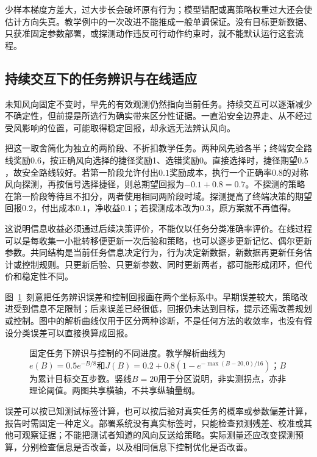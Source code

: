 少样本梯度方差大，过大步长会破坏原有行为；模型错配或离策略权重过大还会使估计方向失真。教学例中的一次改进不能推成一般单调保证。没有目标更新数据、只获准固定参数部署，或探测动作违反可行动作约束时，就不能默认运行这套流程。

\subsection{持续交互下的任务辨识与在线适应}
\label{sec:rl-transfer-identification}

未知风向固定不变时，早先的有效观测仍然指向当前任务。持续交互可以逐渐减少不确定性，但前提是所选行为确实带来区分性证据。一直沿安全边界走、从不经过受风影响的位置，可能取得稳定回报，却永远无法辨认风向。

把这一取舍简化为独立的两阶段、不折扣教学任务。两种风先验各半；终端安全路线奖励$0.6$，按正确风向选择的捷径奖励1、选错奖励0。直接选择时，捷径期望$0.5$，故安全路线较好。若第一阶段允许付出$0.1$奖励成本，执行一个正确率$0.8$的对称风向探测，再按信号选择捷径，则总期望回报为$-0.1+0.8=0.7$。不探测的策略在第一阶段等待且不扣分，两者使用相同两阶段时域。探测提高了终端决策的期望回报$0.2$，付出成本$0.1$，净收益$0.1$；若探测成本改为$0.3$，原方案就不再值得。

这说明信息收益必须通过后续决策评价，不能仅以任务分类准确率评价。在线过程可以是每收集一小批转移便更新一次后验和策略，也可以逐步更新记忆、偶尔更新参数。共同结构是当前任务信息决定行为，行为决定新数据，新数据再更新任务估计或控制规则。只更新后验、只更新参数、同时更新两者，都可能形成闭环，但代价和稳定性不同。

图~\ref{fig:rl-transfer-identification-curves}~刻意把任务辨识误差和控制回报画在两个坐标系中。早期误差较大，策略改进受到信息不足限制；后来误差已经很低，回报仍未达到目标，提示还需改善规划或控制。图中的解析曲线仅用于区分两种诊断，不是任何方法的收敛率，也没有假设分类误差可以直接换算成回报。

\begin{figure}[htbp]
 \centering
 
 \caption{固定任务下辨识与控制的不同进度。教学解析曲线为$e(B)=0.5e^{-B/8}$和$J(B)=0.2+0.8(1-e^{-\max(B-20,0)/16})$；$B$为累计目标交互步数。竖线$B=20$用于分区说明，非实测拐点，亦非理论阈值。两图共享横轴，不共享纵轴量纲。}
 \label{fig:rl-transfer-identification-curves}
\end{figure}

误差可以按已知测试标签计算，也可以按后验对真实任务的概率或参数偏差计算，报告时需固定一种定义。部署系统没有真实标签时，只能检查预测残差、校准或其他可观察证据；不能把测试者知道的风向反送给策略。实际测量还应改变探测预算，分别检查信息是否改善，以及相同信息下控制优化是否改善。

